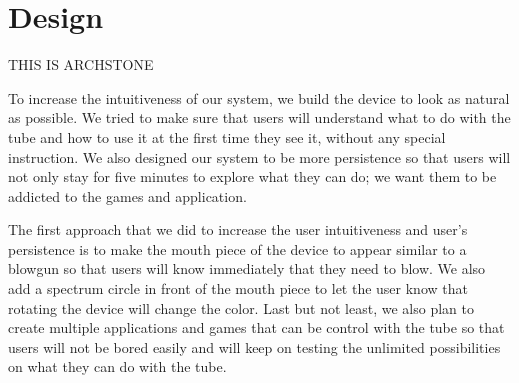 \section{Design}\label{sec:design}

THIS IS ARCHSTONE

To increase the intuitiveness of our system, we build the device to look as natural as possible. We tried to make sure that users will understand what to do with the tube and how to use it at the first time they see it, without any special instruction. We also designed our system to be more persistence so that users will not only stay for five minutes to explore what they can do; we want them to be addicted to the games and application. 

The first approach that we did to increase the user intuitiveness and user’s persistence is to make the mouth piece of the device to appear similar to a blowgun so that users will know immediately that they need to blow. We also add a spectrum circle in front of the mouth piece to let the user know that rotating the device will change the color. Last but not least, we also plan to create multiple applications and games that can be control with the tube so that users will not be bored easily and will keep on testing the unlimited possibilities on what they can do with the tube. 

